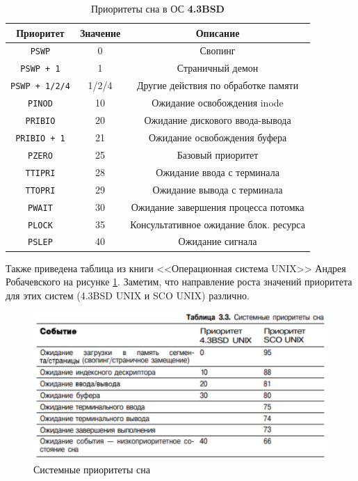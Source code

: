 \begin{table}[h!]
	\caption{Приоритеты
		сна в ОС \textbf{4.3BSD}}
	\label{tab:bsd}
	\begin{center}
		\begin{tabular}{ |c|c|c|  }
			\hline
			\textbf{Приоритет} & \textbf{Значение} & \textbf{Описание} \\
			\hline
			\texttt{PSWP} & 0 & Свопинг \\
			\hline
			\texttt{PSWP + 1} & 1 & Страничный демон \\
			\hline
			\texttt{PSWP + 1/2/4} & 1/2/4 & Другие действия по обработке памяти \\
			\hline
			\texttt{PINOD} & 10 & Ожидание освобождения inode \\
			\hline
			\texttt{PRIBIO} & 20 & Ожидание дискового ввода-вывода \\
			\hline
			\texttt{PRIBIO + 1} & 21 & Ожидание освобождения буфера \\
			\hline
			\texttt{PZERO} & 25 & Базовый приоритет \\
			\hline
			\texttt{TTIPRI} & 28 & Ожидание ввода с терминала \\
			\hline
			\texttt{TTOPRI} & 29 & Ожидание вывода с терминала \\
			\hline
			\texttt{PWAIT} & 30 & Ожидание завершения процесса потомка \\
			\hline
			\texttt{PLOCK} & 35 & Консультативное ожидание блок. ресурса \\
			\hline
			\texttt{PSLEP} & 40 & Ожидание сигнала \\
			\hline
		\end{tabular}
	\end{center}
\end{table}

Также приведена таблица из книги <<Операционная система UNIX>> Андрея Робачевского на рисунке \ref{fig:rob}. Заметим, что направление роста значений приоритета для этих систем (4.3BSD UNIX и SCO UNIX) различно.

\begin{figure}[h!]
	\centering
	\includegraphics[width=0.90\linewidth]{inc/img/sleep.png}
	\caption{Системные приоритеты сна}
	\label{fig:rob}
\end{figure}

